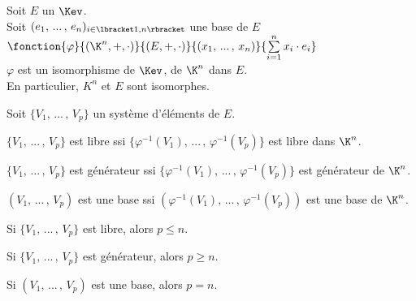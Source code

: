 \documentclass[12pt,twoside,a4paper]{article}
\author{MPSI 2}
\begin{document}
	\maketitle
	\begin{prop}
		Soit $E$ un $\Kev$.\\
		Soit $(e_1,\, ...\,,\,e_n)_{i\in\lbracket1,n\rbracket}$ une base de $E$\\
		$\fonction{\varphi}{(\K^n,+,\cdot)}{(E,+,\cdot)}{(x_1,\,...\,,\,x_n)}{\sum\limits^{n}_{i=1}x_i\cdot e_i}$\\
		$\varphi$ est un isomorphisme de $\Kev$, de $\K^{n}$ dans $E$.\\
		En particulier, $K^n$ et $E$ sont isomorphes.
	\end{prop}
	\begin{prop}
		Soit $\{V_1,\,...\,,\,V_p \}$ un syst\`eme d'\'el\'ements de $E$.
		\begin{liste}
			\item $\{V_1,\,...\,,\,V_p \}$ est libre ssi $\{\varphi^{-1}(V_1),\,...\,,\,\varphi^{-1}(V_p) \}$ est libre dans $\K^n$.
			\item $\{V_1,\,...\,,\,V_p \}$ est g\'en\'erateur ssi $\{\varphi^{-1}(V_1),\,...\,,\,\varphi^{-1}(V_p) \}$ est g\'en\'erateur de $\K^n$.
			\item $(V_1,\,...\,,\,V_p)$ est une base ssi $(\varphi^{-1}(V_1),\,...\,,\,\varphi^{-1}(V_p) )$ est une base de $\K^n$.
		\end{liste}
	\end{prop}
	\begin{coro}
		\begin{liste}
			\item Si $\{V_1,\,...\,,\,V_p \}$ est libre, alors $p\leqslant n$.
			\item Si $\{V_1,\,...\,,\,V_p \}$ est g\'en\'erateur, alors $p\geqslant n$.
			\item Si $(V_1,\,...\,,\,V_p)$ est une base, alors $p=n$.
		\end{liste}
	\end{coro}
\end{document}
